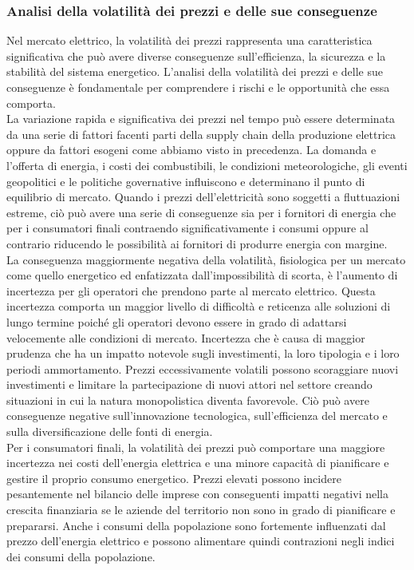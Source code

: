 \documentclass{article}
\begin{document}
\subsubsection{Analisi della volatilità dei prezzi e delle sue conseguenze}
Nel mercato elettrico, la volatilità dei prezzi rappresenta una caratteristica significativa che può avere diverse conseguenze sull'efficienza, la sicurezza e la stabilità del sistema energetico. L'analisi della volatilità dei prezzi e delle sue conseguenze è fondamentale per comprendere i rischi e le opportunità che essa comporta.\\
La variazione rapida e significativa dei prezzi nel tempo può essere determinata da una serie di fattori facenti parti della supply chain della produzione elettrica oppure da fattori esogeni come abbiamo visto in precedenza. La domanda e l'offerta di energia, i costi dei combustibili, le condizioni meteorologiche, gli eventi geopolitici e le politiche governative influiscono e determinano il punto di equilibrio di mercato. Quando i prezzi dell'elettricità sono soggetti a fluttuazioni estreme, ciò può avere una serie di conseguenze sia per i fornitori di energia che per i consumatori finali contraendo significativamente i consumi oppure al contrario riducendo le possibilità ai fornitori di produrre energia con margine.\\
La conseguenza maggiormente negativa della volatilità, fisiologica per un mercato come quello energetico ed enfatizzata dall’impossibilità di scorta, è l’aumento di incertezza per gli operatori che prendono parte al mercato elettrico. Questa incertezza comporta un maggior livello di difficoltà e reticenza alle soluzioni di lungo termine poiché gli operatori devono essere in grado di adattarsi velocemente alle condizioni di mercato. Incertezza che è causa di maggior prudenza che ha un impatto notevole sugli investimenti, la loro tipologia e i loro periodi ammortamento. Prezzi eccessivamente volatili possono scoraggiare nuovi investimenti e limitare la partecipazione di nuovi attori nel settore creando situazioni in cui la natura monopolistica diventa favorevole. Ciò può avere conseguenze negative sull'innovazione tecnologica, sull'efficienza del mercato e sulla diversificazione delle fonti di energia.\\
Per i consumatori finali, la volatilità dei prezzi può comportare una maggiore incertezza nei costi dell'energia elettrica e una minore capacità di pianificare e gestire il proprio consumo energetico. Prezzi elevati possono incidere pesantemente nel bilancio delle imprese con conseguenti impatti negativi nella crescita finanziaria se le aziende del territorio non sono in grado di pianificare e prepararsi. Anche i consumi della popolazione sono fortemente influenzati dal prezzo dell’energia elettrico e possono alimentare quindi contrazioni negli indici dei consumi della popolazione.\\
\end{document}

